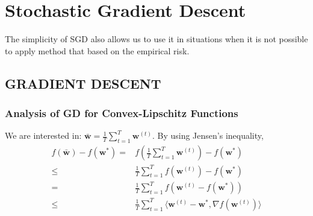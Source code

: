 
\section{Stochastic Gradient Descent}

The simplicity of SGD also allows us to use it in situations when it is not possible to apply method
that based on the empirical risk.

\subsection{GRADIENT DESCENT}

\subsubsection{Analysis of GD for Convex-Lipschitz Functions}

We are interested in: $ \bar{\mathbf{w}} = \frac{1}{T} \sum^T_{t=1} \mathbf{w}^{(t)} $.
By using Jensen's inequality,
\begin{align*}
	f(\bar{\mathbf{w}}) - f(\mathbf{w}^*)
	=& f \left( \frac{1}{T} \sum\limits^T_{t=1} \mathbf{w}^{(t)} \right) - f(\mathbf{w}^*) \\
	\le& \frac{1}{T} \sum\limits^T_{t=1} f \left( \mathbf{w}^{(t)} \right) - f(\mathbf{w}^*) \\
	=& \frac{1}{T} \sum\limits^T_{t=1} f \left( \mathbf{w}^{(t)} - f(\mathbf{w}^*) \right) \\
	\le& \frac{1}{T} \sum\limits^T_{t=1} \langle \mathbf{w}^{(t)} - \mathbf{w}^*, \nabla f(\mathbf{w}^{(t)}) \rangle
\end{align*}

